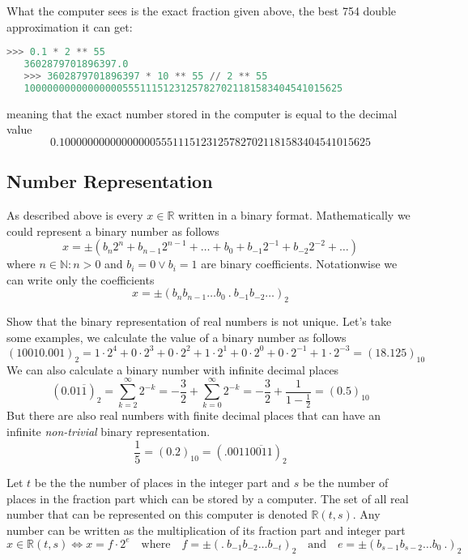 What the computer sees is the exact fraction given above, the best 754 double approximation it can get:
\begin{lstlisting}[language=Python]
   >>> 0.1 * 2 ** 55
   3602879701896397.0
   >>> 3602879701896397 * 10 ** 55 // 2 ** 55
   1000000000000000055511151231257827021181583404541015625\end{lstlisting}
meaning that the exact number stored in the computer is equal to the decimal value
\[0.1000000000000000055511151231257827021181583404541015625\]

\subsection{Number Representation}
As described above is every \(x \in \mathbb{R}\) written in a binary format.
Mathematically we could represent a binary number as follows
\[x = \pm (b_n 2^n + b_{n-1} 2^{n-1} + \ldots + b_0 + b_{-1} 2^{-1} + b_{-2} 2^{-2} + \ldots)\]
where \(n \in \mathbb{N}: n > 0\) and \(b_i = 0 \lor b_i = 1\) are binary coefficients.
Notationwise we can write only the coefficients
\[x = \pm (b_n b_{n-1} \ldots b_0~.~b_{-1} b_{-2} \ldots)_2\]

\begin{example}
   Show that the binary representation of real numbers is not unique.
   Let's take some examples, we calculate the value of a binary number as follows
   \[(10010.001)_2 = 1 \cdot 2^4 + 0 \cdot 2^3 + 0 \cdot 2^2 + 1 \cdot 2^1 + 0 \cdot 2^0 + 0 \cdot 2^{-1} + 1 \cdot 2^{-3} = (18.125)_{10}\]
   We can also calculate a binary number with infinite decimal places
   \[(0.01\overline{1})_2 = \sum_{k = 2}^\infty 2^{-k} = - \frac{3}{2} + \sum_{k=0}^\infty 2^{-k} = - \frac{3}{2} + \frac{1}{1 - \frac{1}{2}} = (0.5)_{10}\]
   But there are also real numbers with finite decimal places that can have an infinite \emph{non-trivial} binary representation.
   \[\frac{1}{5} = (0.2)_{10} = (.0011\overline{0011})_2\]
\end{example}

Let \(t\) be the the number of places in the integer part and \(s\) be the number of places in the fraction part which can be stored by a computer.
The set of all real number that can be represented on this computer is denoted \(\mathbb{R}(t, s)\).
Any number can be written as the multiplication of its fraction part and integer part
\[x \in \mathbb{R}(t,s) \iff x = f \cdot 2^e \quad\text{where}\quad f = \pm (.~b_{-1} b_{-2}\ldots b_{-t})_2 \quad\text{and}\quad e = \pm(b_{s-1}b_{s-2}\ldots b_0~.)_2\]

